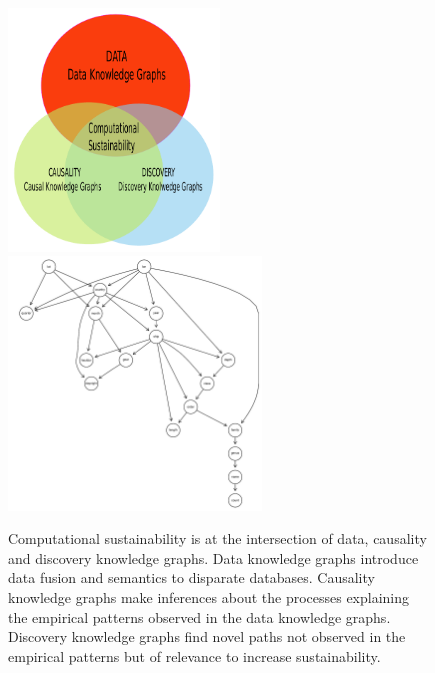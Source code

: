 \documentclass[12pt,a4paper]{article}
\begin{document}
\vspace{-0.5 in}
\begin{figure}[H]
	 \centering
	 \includegraphics[width = 0.5\textwidth]{Fig0.pdf}\\
	 \includegraphics[width =0.6\textwidth]{plots/network_structure.pdf}
	 \caption{Computational sustainability is at the intersection of data, causality and discovery knowledge graphs. Data knowledge graphs introduce data fusion and semantics to disparate databases. Causality knowledge graphs make inferences about the processes explaining the empirical patterns observed in the data knowledge graphs. Discovery knowledge graphs find novel paths not observed in the empirical patterns but of relevance to increase sustainability.}
\end{figure}   
\end{document}
